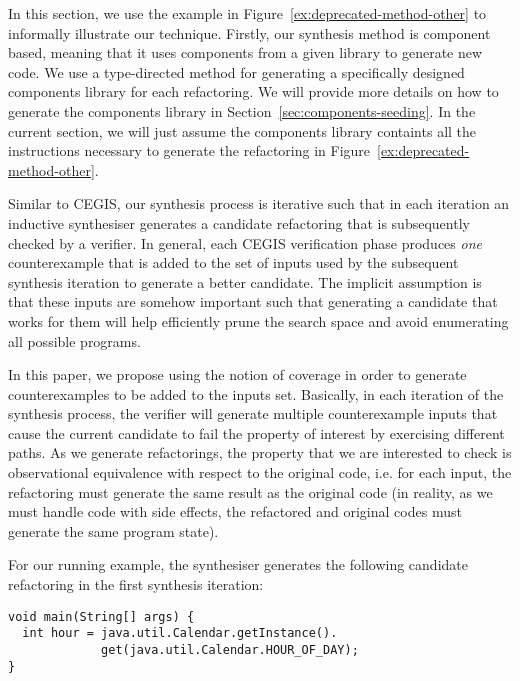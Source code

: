 \documentclass[runningheads,a4paper]{llncs}
\begin{document}
In this section, we use the example in
Figure~\ref{ex:deprecated-method-other} to informally illustrate our
technique.  Firstly, our synthesis method is component based, meaning
that it uses components from a given library to generate new code.  We
use a type-directed method for generating a specifically designed
components library for each refactoring. We will provide more details
on how to generate the components library in
Section~\ref{sec:components-seeding}.  In the current section, we will
just assume the components library containts all the instructions
necessary to generate the refactoring in
Figure~\ref{ex:deprecated-method-other}.

Similar to CEGIS, our synthesis process is iterative such that in each
iteration an inductive synthesiser generates a candidate refactoring
that is subsequently checked by a verifier.  %
In general, each CEGIS
verification phase produces {\em one} counterexample that is added to
the set of inputs used by the subsequent synthesis iteration to
generate a better candidate.  The implicit assumption is that these
inputs are somehow important such that generating a candidate that
works for them will help efficiently prune the search space and avoid
enumerating all possible programs.


In this paper, we propose using the notion of coverage in order to
generate counterexamples to be added to the inputs set. Basically, in
each iteration of the synthesis process, the verifier will generate
multiple counterexample inputs that cause the current candidate to fail the property of interest by
exercising different paths.
%
As we generate refactorings, the property that we are interested to check is observational equivalence
with respect to the original code, i.e. for each input, the refactoring must generate the
same result as the original code (in reality, as we must handle code with side effects,
the refactored and original codes must generate the same program state). 

For our running example, the synthesiser generates the following candidate
refactoring in the first synthesis iteration:
 
\begin{lstlisting}[mathescape=true,showstringspaces=false]
void main(String[] args) {
  int hour = java.util.Calendar.getInstance().
             get(java.util.Calendar.HOUR_OF_DAY);
}
\end{lstlisting}
\end{document}
